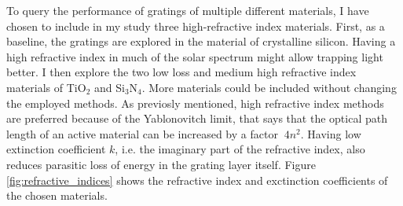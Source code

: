 To query the performance of gratings of multiple different materials, I have chosen to include in my study three high-refractive index materials.
First, as a baseline, the gratings are explored in the material of crystalline silicon. Having a high refractive index in much of the solar spectrum might allow trapping light better.
I then explore the two low loss and medium high refractive index materials of TiO$_2$ and Si$_3$N$_4$. More materials could be included without changing the employed methods.
As previosly mentioned, high refractive index methods are preferred because of the Yablonovitch limit, that says that the optical path length of an active material can be increased by a factor $~4n^2$.
Having low extinction coefficient $k$, i.e. the imaginary part of the refractive index, also reduces parasitic loss of energy in the grating layer itself. Figure \ref{fig:refractive_indices} shows the refractive index and exctinction coefficients of the chosen materials.


